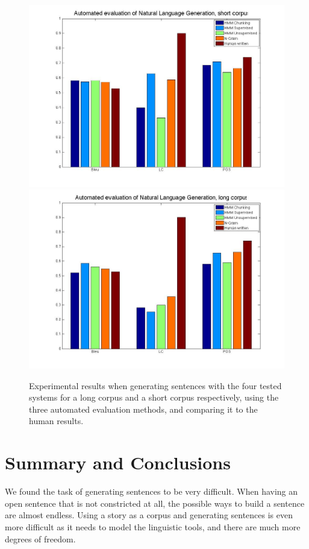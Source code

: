 \documentclass[a4paper,12pt]{article}
\begin{document}
\begin{figure}
\centering
\includegraphics[width=0.8\linewidth]{resultsShort}
\includegraphics[width=0.8\linewidth]{results}
\caption{Experimental results when generating sentences with the four tested systems 
for a long corpus and a short corpus respectively, using the three automated
evaluation methods, and comparing it to the human results.}
\label{fig:longresults}
\end{figure}

\clearpage
\section{Summary and Conclusions}
We found the task of generating sentences to be very difficult. When having an
open sentence that is not constricted at all, the possible ways to build a sentence
are almost endless. Using a story as a corpus and generating sentences is even
more difficult as it needs to model the linguistic tools, and there are much
more degrees of freedom.
\end{document}
